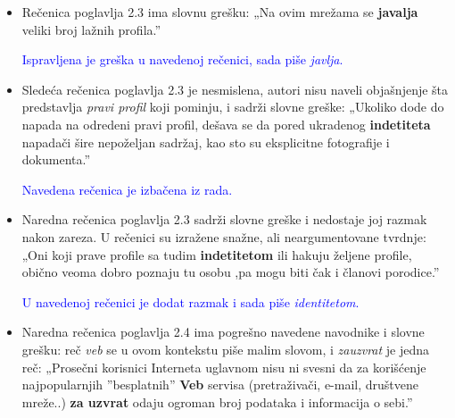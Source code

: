 \documentclass[a4paper]{report}
\newcommand{\odgovor}[1]{\textcolor{blue}{#1}}
\begin{document}
\begin{itemize}
    \item Rečenica poglavlja 2.3 ima slovnu grešku: \newline
    „Na ovim mrežama se \textbf{javalja} veliki broj lažnih profila.”
    
    \odgovor{Ispravljena je greška u navedenoj rečenici, sada piše \textit{javlja}.}
    
\end{itemize}
\begin{itemize}
    \item Sledeća rečenica poglavlja 2.3 je nesmislena, autori nisu naveli objašnjenje šta predstavlja \textit{pravi profil} koji pominju, i sadrži slovne greške:\newline
    „Ukoliko dode do napada na odredeni pravi profil, dešava se da pored ukradenog \textbf{indetiteta} napadači šire nepoželjan sadržaj, kao sto su eksplicitne fotografije i dokumenta.”
    
    \odgovor{Navedena rečenica je izbačena iz rada.}
    
\end{itemize}
\begin{itemize}
    \item Naredna rečenica poglavlja 2.3 sadrži slovne greške i nedostaje joj razmak nakon zareza. U rečenici su izražene snažne, ali neargumentovane tvrdnje: \newline
    „Oni koji prave profile sa tudim \textbf{indetitetom} ili hakuju željene profile, obično veoma dobro poznaju tu osobu ,pa mogu biti čak i članovi porodice.”
    
    \odgovor{U navedenoj rečenici je dodat razmak i sada piše \textit{identitetom}.}
    
\end{itemize}
\begin{itemize}
    \item Naredna rečenica poglavlja 2.4 ima pogrešno navedene navodnike i slovne grešku: reč  \textit{veb} se u ovom kontekstu piše malim slovom, i \textit{zauzvrat} je jedna reč: \newline
    „Prosečni korisnici Interneta uglavnom nisu ni svesni da za korišćenje najpopularnjih ”besplatnih” \textbf{Veb} servisa (pretraživači, e-mail, društvene mreže..) \textbf{za uzvrat} odaju ogroman broj podataka i informacija o sebi.”
    
    \odgovor{}
        
\end{itemize}
\end{document}
